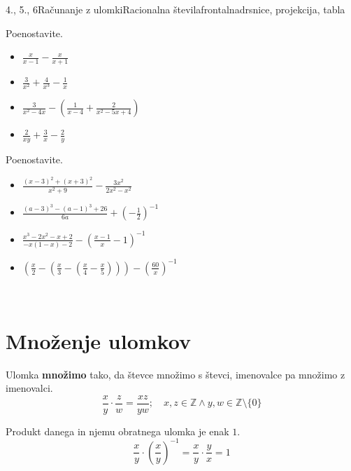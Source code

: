 \begin{priprava}{4., 5., 6}{}{Računanje z ulomki}{Racionalna števila}{frontalna}{drsnice, projekcija, tabla}
    \begin{naloga}
        Poenostavite.
        \begin{itemize}
            \item $\frac{x}{x-1}-\frac{x}{x+1}$ 
            \item $\frac{3}{x^2}+\frac{4}{x^3}-\frac{1}{x}$ 
            \item $\frac{3}{x^2-4x}-\left(\frac{1}{x-4}+\frac{2}{x^2-5x+4}\right)$ 
            \item $\frac{2}{xy}+\frac{3}{x}-\frac{2}{y}$ 
        \end{itemize}
    \end{naloga}




    \begin{naloga}
        Poenostavite.
        \begin{itemize}
            \item $\frac{(x-3)^2+(x+3)^2}{x^2+9}-\frac{3x^2}{2x^2-x^2}$ 
            \item $\frac{(a-3)^3-(a-1)^3+26}{6a}+\left(-\frac{1}{2}\right)^{-1}$ 
            \item $\frac{x^3-2x^2-x+2}{-x(1-x)-2}-\left(\frac{x-1}{x}-1\right)^{-1}$ 
            \item $\left(\frac{x}{2}-\left(\frac{x}{3}-\left(\frac{x}{4}-\frac{x}{5}\right)\right)\right)-\left(\frac{60}{x}\right)^{-1}$ 
        \end{itemize}
    \end{naloga}


    ~

\section{Množenje ulomkov}


        Ulomka \textbf{množimo} tako, da števce množimo s števci, imenovalce pa množimo z imenovalci.
        $$\dfrac{x}{y}\cdot \dfrac{z}{w}=\dfrac{xz}{yw}; \quad x,z\in\mathbb{Z}\land y,w\in\mathbb{Z}\setminus\{0\}$$
        
    
        Produkt danega in njemu obratnega ulomka je enak $1$.
        $$\dfrac{x}{y}\cdot\left(\dfrac{x}{y}\right)^{-1}=\dfrac{x}{y}\cdot\dfrac{y}{x}=1$$
    

    ~



\end{priprava}
